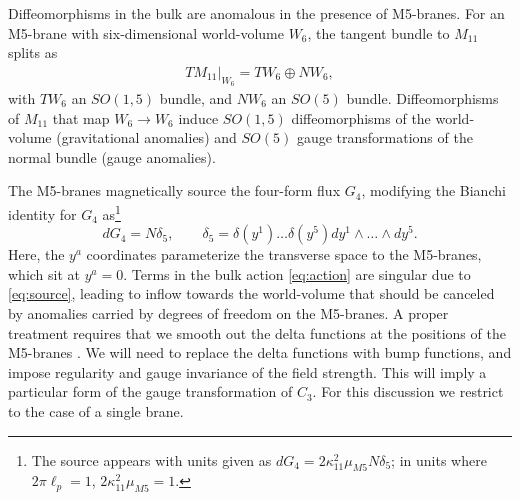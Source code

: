 \documentclass[a4paper,11pt]{article}
\newcommand{\ba}[1]{\begin{align} #1 \end{align} }
\begin{document}
Diffeomorphisms in the bulk are anomalous in the presence of M5-branes. For an M5-brane with six-dimensional world-volume $W_6$, the tangent bundle to $M_{11}$ splits as
	\ba{
	TM_{11}|_{W_6} = TW_6 \oplus NW_6, \label{eq:tmsplit}
	}
with $TW_6$ an $SO(1,5)$ bundle, and $NW_6$ an $SO(5)$ bundle.  Diffeomorphisms of $M_{11}$ that map $W_6\to W_6$ induce $SO(1,5)$ diffeomorphisms of the world-volume (gravitational anomalies) and $SO(5)$ gauge transformations of the normal bundle (gauge anomalies).  

The M5-branes magnetically source the four-form flux $G_4$, modifying the Bianchi identity for $G_4$ as\footnote{The source appears with units given as $
dG_4=2\kappa_{11}^2 \mu_{M5} N \delta_{5}$; in units where $2\pi \ell_p=1$, $2\kappa_{11}^2 \mu_{M5}=1$. }
	\begin{equation}
	dG_4= N \delta_{5}, \qquad  \delta_5 = \delta(y^1)\dots \delta(y^5)dy^1\wedge\dots \wedge dy^5. \label{eq:source} 
	\end{equation}
Here, the $y^a$ coordinates parameterize the transverse space to the M5-branes, which sit at $y^a=0$. Terms in the bulk action \eqref{eq:action} are singular due to \eqref{eq:source}, leading to inflow towards the world-volume that should be canceled by anomalies carried by degrees of freedom on the M5-branes. 
A proper treatment requires that we smooth out the delta functions at the positions of the M5-branes  \cite{Freed:1998tg}. We will need to replace the delta functions with bump functions, and impose regularity and gauge invariance of the field strength. This will imply a particular form of the gauge transformation of $C_3$. For this discussion we restrict to the case of a single brane.
\end{document}
